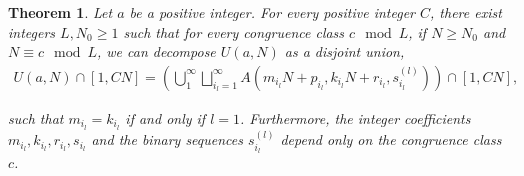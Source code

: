 \documentclass{amsart}
\theoremstyle{theorem}
\newtheorem{theorem}{Theorem}[section]
\theoremstyle{definition}
\begin{document}
\begin{theorem}\label{RigidityTheorem}
Let $a$ be a positive integer. For every positive integer $C$, there exist integers $L,N_0 \geq 1$ such that for every congruence class $c \mod L$, if $N \geq N_0$ and $N \equiv c \mod L$, we can decompose $U(a,N)$ as a disjoint union,
	\begin{align*}
	U(a,N) \cap [1,CN] = \left(\bigcup_{1}^\infty\bigsqcup_{i_l = 1}^\infty A\left(m_{i_l}N + p_{i_l}, k_{i_l}N + r_{i_l},s^{(l)}_{i_l}\right)\right) \cap [1,CN],
	\end{align*}
			
\noindent such that $m_{i_l} = k_{i_l}$ if and only if $l = 1$. Furthermore, the integer coefficients $m_{i_l}, k_{i_l}, r_{i_l}, s_{i_l}$ and the binary sequences $s^{(l)}_{i_l}$ depend only on the congruence class $c$.
\end{theorem}
	
\end{document}
